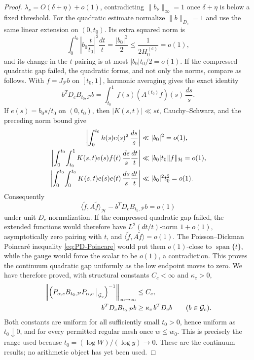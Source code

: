 \documentclass[11pt]{article}
\numberwithin{equation}{section}
\theoremstyle{definition}
\theoremstyle{remark}
\newcommand{\1}{\mathbf 1}
\begin{document}
\begin{proof}
\(\lambda_\nu=O(\delta+\eta)+o(1)\), contradicting
\(\|b_\nu\|_\infty=1\) once \(\delta+\eta\) is below a fixed
threshold.  For the quadratic estimate normalize
\(\|b\|_{D_c}=1\) and use the same linear extension on
\((0,t_0)\).  Its extra squared norm is
\[
 \int_0^{t_0}\left|b_0\frac{t}{t_0}\right|^2\frac{dt}{t}
 =\frac{|b_0|^2}{2}
 \leq\frac1{2H_0^{(c)}}=o(1),
\]
and its change in the \(t\)-pairing is at most
\(|b_0|t_0/2=o(1)\).  If the compressed quadratic gap failed, the
quadratic forms, and not only the norms, compare as follows.  With
\(f=J_{\mathcal P}b\) on \([t_0,1]\), harmonic averaging gives the
exact identity
\begin{equation}
 b^TD_cB_{t_0,\mathcal P}b
 =\int_{t_0}^1 f(s)(A^{(t_0)}f)(s)\,\frac{ds}{s}.
 \label{eq:smooth-compressed-form-identity}
\end{equation}
If \(e(s)=b_0s/t_0\) on \((0,t_0)\), then
\(|K(s,t)|\ll st\), Cauchy--Schwarz, and the preceding norm bound give
\begin{align}
 \left|\int_0^{t_0}h(s)e(s)^2\,\frac{ds}{s}\right|
     &\ll |b_0|^2=o(1),\notag\\
 \left|\int_0^{t_0}\!\int_{t_0}^1
       K(s,t)e(s)f(t)\,\frac{ds}{s}\frac{dt}{t}\right|
     &\ll |b_0|t_0\|f\|_{\mathcal H}=o(1),\notag\\
 \left|\int_0^{t_0}\!\int_0^{t_0}
       K(s,t)e(s)e(t)\,\frac{ds}{s}\frac{dt}{t}\right|
     &\ll |b_0|^2t_0^2=o(1).
 \label{eq:smooth-low-extension-form-error}
\end{align}
Consequently
\begin{equation}
 \langle\widetilde f,A\widetilde f\rangle_{\mathcal H}
       -b^TD_cB_{t_0,\mathcal P}b=o(1)
 \label{eq:smooth-full-compressed-form-comparison}
\end{equation}
under unit \(D_c\)-normalization.  If the compressed quadratic gap
failed, the extended functions would therefore have
\(L^2(dt/t)\)-norm \(1+o(1)\), asymptotically zero pairing with \(t\),
and \(\langle\widetilde f,A\widetilde f\rangle=o(1)\).  The
Poisson--Dickman Poincar\'e
inequality \eqref{eq:PD-Poincare} would put them \(o(1)\)-close to
\(\operatorname{span}\{t\}\), while the gauge would force the scalar
to be \(o(1)\), a contradiction.  This proves the continuum quadratic
gap uniformly as the low endpoint moves to zero.  We have therefore
proved, with structural constants \(C_c<\infty\) and \(\kappa_c>0\),
\begin{align}
 \left\|\left(P_{\alpha,c}B_{t_0,\mathcal P}P_{\alpha,c}
       \bigm|_{\mathcal G_c}\right)^{-1}\right\|_{\infty\to\infty}
 &\leq C_c,\label{eq:smooth-continuum-band-inverse}\\
 b^TD_cB_{t_0,\mathcal P}b
 &\geq\kappa_c\,b^TD_cb\qquad(b\in\mathcal G_c).
 \label{eq:smooth-continuum-band-gap}
\end{align}
Both constants are uniform for all sufficiently small \(t_0>0\), hence
uniform as \(t_0\downarrow0\), and for every permitted regular mesh once
\(w\leq w_0\).  This is precisely the range used because
\(t_0=(\log W)/(\log y)\to0\).  These are the continuum results; no
arithmetic object has yet been used.


\end{proof}
\end{document}
